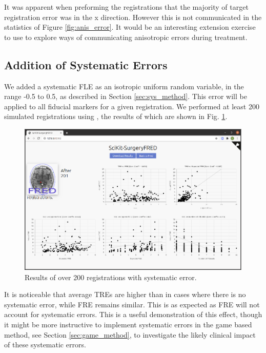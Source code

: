 It was apparent when preforming the registrations that the majority of target 
registration error was in the x direction. However this is not communicated in the 
statistics of Figure \ref{fig:anis_error}. It would be an interesting extension 
exercise to use \fred to explore ways of communicating anisotropic errors during 
treatment.

\subsection{Addition of Systematic Errors}
We added a systematic \gls{FLE} as an isotropic uniform random variable, in the range
-0.5 to 0.5, as described in Section \ref{sec:sys_method}. This error will be applied to all fiducial markers for a 
given registration. We performed at least 200 simulated registrations using \fred, the results of which are shown in Fig. \ref{fig:sys_error}.
\begin{figure}
	\begin{center}
			\includegraphics[width=0.9\linewidth]{images/systematic_error.eps}
			\caption{\label{fig:sys_error}Results of over 200 registrations with systematic error.}
	\end{center}
\end{figure}

It is noticeable that average \gls{TRE}s are higher than in cases where there is no
systematic error, while \gls{FRE} remains similar. This is as expected as \gls{FRE} will 
not account for systematic errors. This is a useful demonstration of this effect, though 
it might be more instructive to implement systematic errors in the game based method, see
Section \ref{sec:game_method}, to investigate the likely clinical impact of these
systematic errors.

